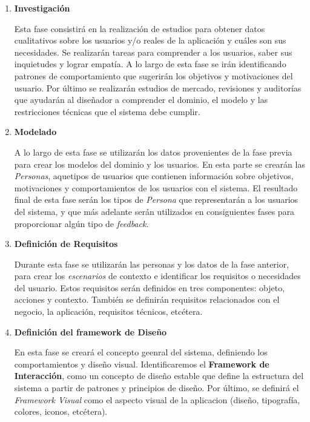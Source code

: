 \begin{enumerate}

\item \textbf{Investigación}

Esta fase consistirá en la realización de estudios para obtener datos cualitativos sobre los usuarios y/o reales de la aplicación y cuáles son sus necesidades. Se realizarán tareas para comprender a los usuarios, saber sus inquietudes y lograr empatía. A lo largo de esta fase se irán identificando patrones de comportamiento que sugerirán los objetivos y motivaciones del usuario. Por último se realizarán estudios de mercado, revisiones y auditorías que ayudarán al diseñador a comprender el dominio, el modelo y las restricciones técnicas que el sistema debe cumplir.

\item \textbf{Modelado}

A lo largo de esta fase se utilizarán los datos provenientes de la fase previa para crear los modelos del dominio y los usuarios. En esta parte se crearán las \textit{Personas}, aquetipos de usuarios que contienen información sobre objetivos, motivaciones y comportamientos de los usuarios con el sistema. El resultado final de esta fase serán los tipos de \textit{Persona} que representarán a los usuarios del sistema, y que más adelante serán utilizados en consiguientes fases para proporcionar algún tipo de \textit{feedback}.

\item \textbf{Definición de Requisitos}

Durante esta fase se utilizarán las personas y los datos de la fase anterior, para crear los \textit{escenarios} de contexto e identificar los requisitos o necesidades del usuario. Estos requisitos serán definidos en tres componentes: objeto, acciones y contexto. También se definirán requisitos relacionados con el negocio, la aplicación, requisitos técnicos, etcétera.

\item \textbf{Definición del framework de Diseño}

En esta fase se creará el concepto geenral del sistema, definiendo los comportamientos y diseño visual. Identificaremos el \textbf{Framework de Interacción}, como un concepto de diseño estable que define la estructura del sistema a partir de patrones y principios de diseño. Por último, se definirá el \textit{Framework Visual} como el aspecto visual de la aplicacion (diseño, tipografía, colores, iconos, etcétera).

\end{enumerate}

